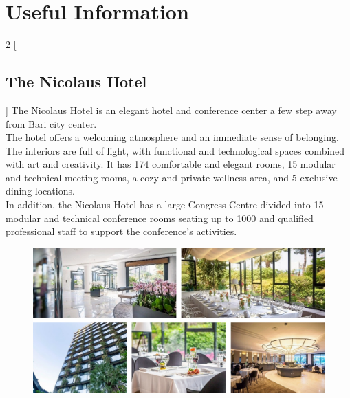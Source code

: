 \documentclass[
	openany, %
	parskip=full, %
	12pt, %
	a4paper, %
]{conferencebooklet} %
\begin{document}
\chapter{Useful Information}


\begin{multicols}{2}
[\section{The Nicolaus Hotel}]
The Nicolaus Hotel is an elegant hotel and conference center a few step away from Bari city center. \\
The hotel offers a welcoming atmosphere and an immediate sense of belonging. The interiors are full of light, with functional and technological spaces combined with art and creativity. It has 174 comfortable and elegant rooms, 15 modular and technical meeting rooms, a cozy and private wellness area, and 5 exclusive dining locations. \\
In addition, the Nicolaus Hotel has a large Congress Centre divided into 15 modular and technical conference rooms seating up to 1000 and qualified professional staff to support the conference’s activities.
\end{multicols}

\vspace{-5mm}
\begin{figure}[h!]
    \centering
    \includegraphics[width=\linewidth]{images/useful_info/nicolaus/nicolaus.jpg}
\end{figure}


\vspace{-5mm}
\end{document}
